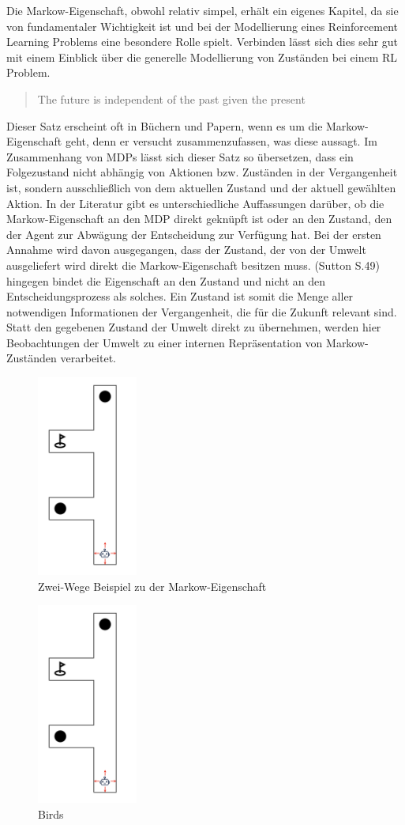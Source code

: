Die Markow-Eigenschaft, obwohl relativ simpel, erhält ein eigenes Kapitel, da sie von fundamentaler Wichtigkeit ist und bei der Modellierung eines Reinforcement Learning Problems eine besondere Rolle spielt. Verbinden lässt sich dies sehr gut mit einem Einblick über die generelle Modellierung von Zuständen bei einem RL Problem.

\begin{quote}
    The future is independent of the past given the present
  \end{quote}

Dieser Satz erscheint oft in Büchern und Papern, wenn es um die Markow-Eigenschaft geht, denn er versucht zusammenzufassen, was diese aussagt. Im Zusammenhang von MDPs lässt sich dieser Satz so übersetzen, dass ein Folgezustand nicht abhängig von Aktionen bzw. Zuständen in der Vergangenheit ist, sondern ausschließlich von dem aktuellen Zustand und der aktuell gewählten Aktion.
In der Literatur gibt es unterschiedliche Auffassungen darüber, ob die Markow-Eigenschaft an den MDP direkt geknüpft ist oder an den Zustand, den der Agent zur Abwägung der Entscheidung zur Verfügung hat. Bei der ersten Annahme wird davon ausgegangen, dass der Zustand, der von der Umwelt ausgeliefert wird direkt die Markow-Eigenschaft besitzen muss. (Sutton S.49) hingegen bindet die Eigenschaft an den Zustand und nicht an den Entscheidungsprozess als solches. Ein Zustand ist somit die Menge aller notwendigen Informationen der Vergangenheit, die für die Zukunft relevant sind. Statt den gegebenen Zustand der Umwelt direkt zu übernehmen, werden hier Beobachtungen der Umwelt zu einer internen Repräsentation von Markow-Zuständen verarbeitet.


\begin{figure}[H]
    \centering
    \includegraphics[height=250px]{images/2passagesDefault.png}
    \caption{ Zwei-Wege Beispiel zu der Markow-Eigenschaft}
\end{figure}

\begin{figure}
  \begin{center}
  \includegraphics[height=250px]{images/2passagesDefault.png}  \end{center}
  \caption{Birds}
\end{figure}
